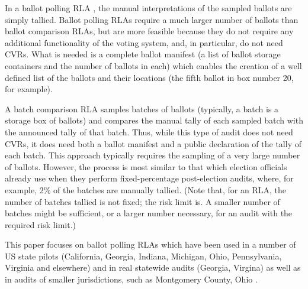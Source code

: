 In a ballot polling RLA \cite{RLA}, the manual interpretations of the sampled ballots are simply tallied. Ballot polling RLAs require a much larger number of ballots than ballot comparison RLAs, but are more feasible because they do not require any additional functionality of the voting system, and, in particular, do not need CVRs. What is needed is a complete ballot manifest (a list of ballot storage containers and the number of ballots in each) which enables the creation of a well defined list of the ballots and their locations (the fifth ballot in box number 20, for example).  

A batch comparison RLA \cite{RI-report} samples batches of ballots (typically, a batch is a storage box of ballots) and compares the manual tally of each sampled batch with the announced tally of that batch. Thus, while this type of audit does not need CVRs, it does need both a ballot manifest and a public declaration of the tally of each batch. This approach typically requires the sampling of a very large number of ballots. However, the process is most similar to that which election officials already use when they perform fixed-percentage post-election audits, where, for example, 2\% of the batches are manually tallied. (Note that, for an RLA, the number of batches tallied is not fixed; the risk limit is. A smaller number of batches might be sufficient, or a larger number necessary, for an audit with the required risk limit.)

This paper focuses on ballot polling RLAs which have been used in a number of US state pilots (California, Georgia, Indiana, Michigan, Ohio, Pennsylvania, Virginia and elsewhere) and in real statewide audits (Georgia, Virgina) \cite{vv_audits} as well as in audits of smaller jurisdictions, such as Montgomery County, Ohio \cite{usenix_minerva}. 

